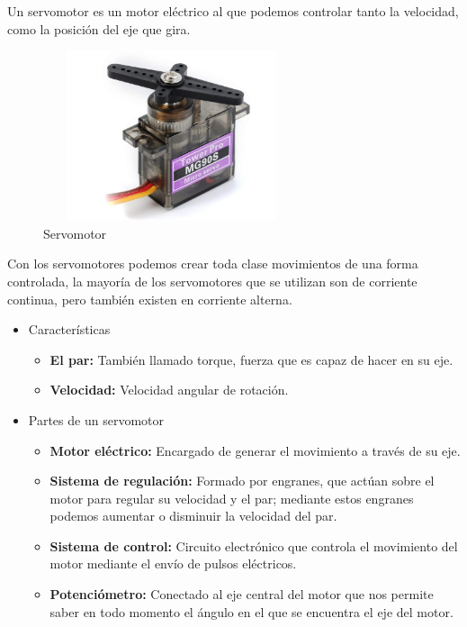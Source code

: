 Un servomotor es un motor eléctrico al que podemos controlar tanto la velocidad, como la posición del eje que gira. 
\\
\begin{figure}[H]
\centering
\includegraphics[width=7.5cm, height=5cm]{./images/estado-arte/servo-motor.jpg}
\caption{Servomotor}
\label{fig:servoMotor}
\end{figure}

Con los servomotores podemos crear toda clase movimientos de una forma controlada, la mayoría de los servomotores que se utilizan son de corriente continua, pero también existen en corriente alterna. \\
\begin{itemize}
    \item Características
    \begin{itemize}
        \item \textbf{El par:} También llamado torque, fuerza que es capaz de hacer en su eje.
        \item \textbf{Velocidad:} Velocidad angular de rotación.
    \end{itemize}
    
    \item Partes de un servomotor
    \begin{itemize}
        \item \textbf{Motor eléctrico:} Encargado de generar el movimiento a través de su eje.
        \item \textbf{Sistema de regulación:} Formado por engranes, que actúan sobre el motor para regular su velocidad y el par; mediante estos engranes podemos aumentar o disminuir la velocidad del par.
        \item \textbf{Sistema de control:} Circuito electrónico que controla el movimiento del motor mediante el envío de pulsos eléctricos.
        \item \textbf{Potenciómetro:} Conectado al eje central del motor que nos permite saber en todo momento el ángulo en el que se encuentra el eje del motor.
    \end{itemize}
\end{itemize}

